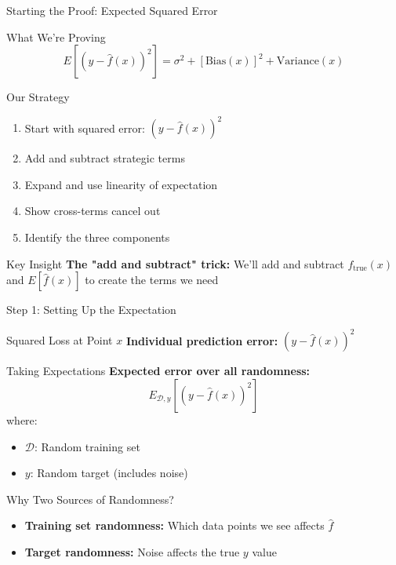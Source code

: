 \documentclass[10pt]{beamer}
\begin{document}
\begin{frame}{Starting the Proof: Expected Squared Error}
\begin{definitionbox}{What We're Proving}
$$E[(y - \hat{f}(x))^2] = \sigma^2 + [\text{Bias}(x)]^2 + \text{Variance}(x)$$
\end{definitionbox}

\begin{keypointsbox}{Our Strategy}
\begin{enumerate}
\item Start with squared error: $(y - \hat{f}(x))^2$
\item Add and subtract strategic terms
\item Expand and use linearity of expectation
\item Show cross-terms cancel out
\item Identify the three components
\end{enumerate}
\end{keypointsbox}

\begin{examplebox}{Key Insight}
\textbf{The "add and subtract" trick:} We'll add and subtract $f_{\text{true}}(x)$ and $E[\hat{f}(x)]$ to create the terms we need
\end{examplebox}
\end{frame}

\begin{frame}{Step 1: Setting Up the Expectation}
\begin{definitionbox}{Squared Loss at Point $x$}
\textbf{Individual prediction error:} $(y - \hat{f}(x))^2$
\end{definitionbox}

\begin{keypointsbox}{Taking Expectations}
\textbf{Expected error over all randomness:}
$$E_{\mathcal{D}, y}[(y - \hat{f}(x))^2]$$
where:
\begin{itemize}
\item $\mathcal{D}$: Random training set
\item $y$: Random target (includes noise)
\end{itemize}
\end{keypointsbox}

\begin{examplebox}{Why Two Sources of Randomness?}
\begin{itemize}
\item \textbf{Training set randomness:} Which data points we see affects $\hat{f}$
\item \textbf{Target randomness:} Noise affects the true $y$ value
\end{itemize}
\end{examplebox}
\end{frame}
\end{document}
